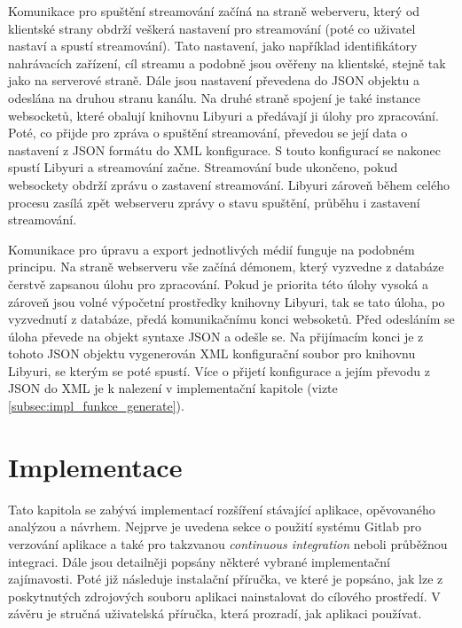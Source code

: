 \documentclass[thesis=M,czech]{FITthesis}[2012/06/26]
\begin{document}
	Komunikace pro spuštění streamování začíná na straně weberveru, který od klientské strany obdrží veškerá nastavení pro streamování (poté co uživatel nastaví a spustí streamování). Tato nastavení, jako například identifikátory nahrávacích zařízení, cíl streamu a podobně jsou ověřeny na klientské, stejně tak jako na serverové straně. Dále jsou nastavení převedena do JSON objektu a odeslána na druhou stranu kanálu. Na druhé straně spojení je také instance websocketů, které obalují knihovnu Libyuri a předávají ji úlohy pro zpracování. Poté, co přijde pro zpráva o spuštění streamování, převedou se její data o nastavení z JSON formátu do XML konfigurace. S touto konfigurací se nakonec spustí Libyuri a streamování začne. Streamování bude ukončeno, pokud websockety obdrží zprávu o zastavení streamování. Libyuri zároveň během celého procesu zasílá zpět webserveru zprávy o stavu spuštění, průběhu i zastavení streamování.
	
	Komunikace pro úpravu a export jednotlivých médií funguje na podobném principu. Na straně webserveru vše začíná démonem, který vyzvedne z databáze čerstvě zapsanou úlohu pro zpracování. Pokud je priorita této úlohy vysoká a zároveň jsou volné výpočetní prostředky knihovny Libyuri, tak se tato úloha, po vyzvednutí z databáze, předá komunikačnímu konci websoketů. Před odesláním se úloha převede na objekt syntaxe JSON a odešle se. Na přijímacím konci je z tohoto JSON objektu vygenerován XML konfigurační soubor pro knihovnu Libyuri, se kterým se poté spustí. Více o přijetí konfigurace a jejím převodu z JSON do XML je k nalezení v implementační kapitole (vizte \ref{subsec:impl_funkce_generate}).
	
\chapter{Implementace} \label{chap:impl}
Tato kapitola se zabývá implementací rozšíření stávající aplikace, opěvovaného analýzou a návrhem. Nejprve je uvedena sekce o použití systému Gitlab pro verzování aplikace a také pro takzvanou \textit{continuous integration} neboli průběžnou integraci. Dále jsou detailněji popsány některé vybrané implementační zajímavosti. Poté již následuje instalační příručka, ve které je popsáno, jak lze z poskytnutých zdrojových souboru aplikaci nainstalovat do cílového prostředí. V závěru je stručná uživatelská příručka, která prozradí, jak aplikaci používat.
\end{document}

